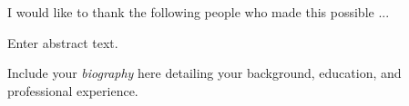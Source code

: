 \documentclass[11pt]{report}
\begin{document}
\acknowledgementspage

\noindent I would like to thank the following people who made this possible ...


\tableofcontents

\listoftables

\listoffigures

\abstractpage

Enter abstract text.

\startofchapters









\appendix
\appendixeqnumbering











\biography

\noindent Include your \emph{biography} here detailing your background, education, and professional experience.
\end{document}

